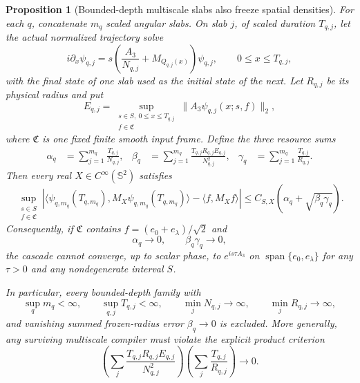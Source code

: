 \documentclass[11pt]{article}
\newtheorem{proposition}[theorem]{Proposition}
\theoremstyle{remark}
\begin{document}
\begin{proposition}[Bounded-depth multiscale slabs also freeze spatial
densities]
\label{prop:bounded-depth-density-no-go}
For each $q$, concatenate $m_q$ scaled angular slabs.  On slab $j$, of scaled
duration $T_{q,j}$, let the actual normalized trajectory solve
\begin{equation}
 i\partial_x\psi_{q,j}
 =
 s\left(\frac{A_3}{N_{q,j}}+M_{Q_{q,j}(x)}\right)\psi_{q,j},
 \qquad 0\leq x\leq T_{q,j},
 \label{eq:multiscale-angular-slab}
\end{equation}
with the final state of one slab used as the initial state of the next.  Let
$R_{q,j}$ be its physical radius and put
\[
 E_{q,j}
 =
 \sup_{\substack{s\in S,\ 0\leq x\leq T_{q,j}\\
                  f\in\mathfrak C}}
 \|A_3\psi_{q,j}(x;s,f)\|_2,
\]
where $\mathfrak C$ is one fixed finite smooth input frame.  Define the three
resource sums
\begin{align}
 \alpha_q&=\sum_{j=1}^{m_q}\frac{T_{q,j}}{N_{q,j}},
 &
 \beta_q&=\sum_{j=1}^{m_q}
       \frac{T_{q,j}R_{q,j}E_{q,j}}{N_{q,j}^2},
 &
 \gamma_q&=\sum_{j=1}^{m_q}\frac{T_{q,j}}{R_{q,j}}.
 \label{eq:multiscale-density-resources}
\end{align}
Then every real $X\in C^\infty(\mathbb S^2)$ satisfies
\begin{equation}
 \sup_{\substack{s\in S\\f\in\mathfrak C}}
 \left|
 \langle\psi_{q,m_q}(T_{q,m_q}),M_X
                  \psi_{q,m_q}(T_{q,m_q})\rangle
 -
 \langle f,M_Xf\rangle
 \right|
 \leq
 C_{S,X}\left(\alpha_q+\sqrt{\beta_q\gamma_q}\right).
 \label{eq:multiscale-density-freezing}
\end{equation}
Consequently, if $\mathfrak C$ contains
$f=(e_0+e_\lambda)/\sqrt2$ and
\begin{equation}
 \alpha_q\longrightarrow0,
 \qquad
 \beta_q\gamma_q\longrightarrow0,
 \label{eq:multiscale-density-no-go-condition}
\end{equation}
the cascade cannot converge, up to scalar phase, to
$e^{is\tau A_3}$ on
$\operatorname{span}\{e_0,e_\lambda\}$ for any $\tau>0$ and any
nondegenerate interval $S$.

In particular, every bounded-depth family with
\[
 \sup_qm_q<\infty,\qquad
 \sup_{q,j}T_{q,j}<\infty,\qquad
 \min_jN_{q,j}\longrightarrow\infty,\qquad
 \min_jR_{q,j}\longrightarrow\infty,
\]
and vanishing summed frozen-radius error $\beta_q\to0$ is excluded.  More
generally, any surviving multiscale compiler must violate the explicit
product criterion
\[
 \left(\sum_j\frac{T_{q,j}R_{q,j}E_{q,j}}{N_{q,j}^2}\right)
 \left(\sum_j\frac{T_{q,j}}{R_{q,j}}\right)\longrightarrow0.
\]
\end{proposition}
\end{document}
